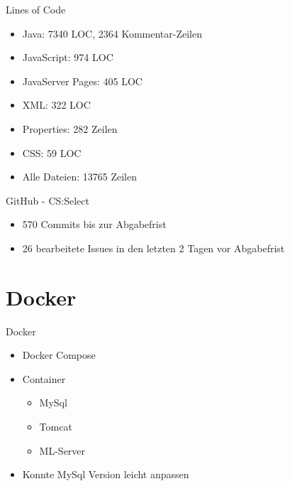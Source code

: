 \documentclass[xcolor=dvipsnames]{beamer}
\begin{document}
\begin{frame}{Lines of Code}
  \begin{itemize}
    \item Java: 7340 LOC, 2364 Kommentar-Zeilen \\
    \item JavaScript: 974 LOC \\
    \item JavaServer Pages: 405 LOC \\
    \item XML: 322 LOC \\
    \item Properties: 282 Zeilen \\
    \item CSS: 59 LOC \\
    \item Alle Dateien: 13765 Zeilen \\
  \end{itemize}
\end{frame}

\begin{frame}{GitHub - CS:Select}
    \begin{itemize}
        \item 570 Commits bis zur Abgabefrist \\
        \item 26 bearbeitete Issues in den letzten 2 Tagen vor Abgabefrist \\
    \end{itemize}
\end{frame}

\section{Docker}
\begin{frame}{Docker}
\begin{itemize}
    \item Docker Compose
    \item Container
    \begin{itemize}
        \item MySql
        \item Tomcat
        \item ML-Server
    \end{itemize}
    \item Konnte MySql Version leicht anpassen
\end{itemize}
\end{frame}
\end{document}
